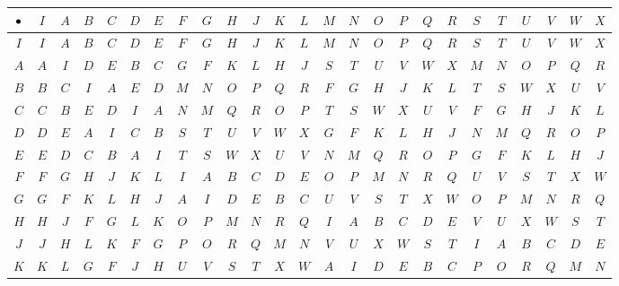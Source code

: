 \documentclass[../gatm_answers.tex]{subfiles}
\begin{document}
\begin{figure}
	\begin{center}
		\setlength{\tabcolsep}{2pt}
		\begin{tabular}{c|acccacccacccacccacccaccc}
			\hline
			$\bullet$ & $I$ & $A$ & $B$ & $C$ & $D$ & $E$ & $F$ & $G$ & $H$ & $J$ & $K$ & $L$ & $M$ & $N$ & $O$ & $P$ & $Q$ & $R$ & $S$ & $T$ & $U$ & $V$ & $W$ & $X$ \\ \hline
			$I$ & $I$ & $A$ & $B$ & $C$ & $D$ & $E$ & $F$ & $G$ & $H$ & $J$ & $K$ & $L$ & $M$ & $N$ & $O$ & $P$ & $Q$ & $R$ & $S$ & $T$ & $U$ & $V$ & $W$ & $X$ \\
			$A$ & $A$ & $I$ & $D$ & $E$ & $B$ & $C$ & $G$ & $F$ & $K$ & $L$ & $H$ & $J$ & $S$ & $T$ & $U$ & $V$ & $W$ & $X$ & $M$ & $N$ & $O$ & $P$ & $Q$ & $R$ \\
			$B$ & $B$ & $C$ & $I$ & $A$ & $E$ & $D$ & $M$ & $N$ & $O$ & $P$ & $Q$ & $R$ & $F$ & $G$ & $H$ & $J$ & $K$ & $L$ & $T$ & $S$ & $W$ & $X$ & $U$ & $V$ \\
			$C$ & $C$ & $B$ & $E$ & $D$ & $I$ & $A$ & $N$ & $M$ & $Q$ & $R$ & $O$ & $P$ & $T$ & $S$ & $W$ & $X$ & $U$ & $V$ & $F$ & $G$ & $H$ & $J$ & $K$ & $L$ \\
			$D$ & $D$ & $E$ & $A$ & $I$ & $C$ & $B$ & $S$ & $T$ & $U$ & $V$ & $W$ & $X$ & $G$ & $F$ & $K$ & $L$ & $H$ & $J$ & $N$ & $M$ & $Q$ & $R$ & $O$ & $P$ \\
			$E$ & $E$ & $D$ & $C$ & $B$ & $A$ & $I$ & $T$ & $S$ & $W$ & $X$ & $U$ & $V$ & $N$ & $M$ & $Q$ & $R$ & $O$ & $P$ & $G$ & $F$ & $K$ & $L$ & $H$ & $J$ \\
			$F$ & $F$ & $G$ & $H$ & $J$ & $K$ & $L$ & $I$ & $A$ & $B$ & $C$ & $D$ & $E$ & $O$ & $P$ & $M$ & $N$ & $R$ & $Q$ & $U$ & $V$ & $S$ & $T$ & $X$ & $W$ \\
			$G$ & $G$ & $F$ & $K$ & $L$ & $H$ & $J$ & $A$ & $I$ & $D$ & $E$ & $B$ & $C$ & $U$ & $V$ & $S$ & $T$ & $X$ & $W$ & $O$ & $P$ & $M$ & $N$ & $R$ & $Q$ \\
			$H$ & $H$ & $J$ & $F$ & $G$ & $L$ & $K$ & $O$ & $P$ & $M$ & $N$ & $R$ & $Q$ & $I$ & $A$ & $B$ & $C$ & $D$ & $E$ & $V$ & $U$ & $X$ & $W$ & $S$ & $T$ \\
			$J$ & $J$ & $H$ & $L$ & $K$ & $F$ & $G$ & $P$ & $O$ & $R$ & $Q$ & $M$ & $N$ & $V$ & $U$ & $X$ & $W$ & $S$ & $T$ & $I$ & $A$ & $B$ & $C$ & $D$ & $E$ \\
			$K$ & $K$ & $L$ & $G$ & $F$ & $J$ & $H$ & $U$ & $V$ & $S$ & $T$ & $X$ & $W$ & $A$ & $I$ & $D$ & $E$ & $B$ & $C$ & $P$ & $O$ & $R$ & $Q$ & $M$ & $N$ \\

\end{tabular}
\end{center}
\end{figure}
\end{document}
